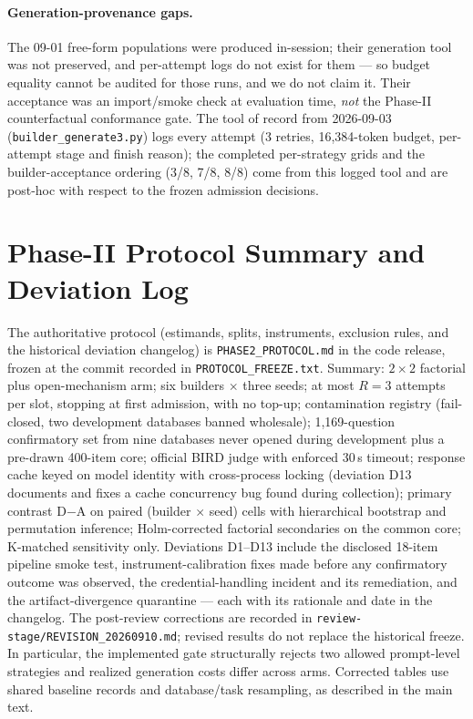 \paragraph{Generation-provenance gaps.} The 09-01 free-form populations
were produced in-session; their generation tool was not preserved, and
per-attempt logs do not exist for them --- so budget equality cannot be
audited for those runs, and we do not claim it. Their acceptance was an
import/smoke check at evaluation time, \emph{not} the Phase-II
counterfactual conformance gate. The tool of record from 2026-09-03
(\texttt{builder\_generate3.py}) logs every attempt (3 retries,
16{,}384-token budget, per-attempt stage and finish reason); the completed
per-strategy grids and the builder-acceptance ordering (3/8, 7/8, 8/8)
come from this logged tool and are post-hoc with respect to the frozen
admission decisions.

\section{Phase-II Protocol Summary and Deviation Log}\label{app:phase2-protocol}

The authoritative protocol (estimands, splits, instruments, exclusion
rules, and the historical deviation changelog) is
\texttt{PHASE2\_PROTOCOL.md} in the code release, frozen at the commit
recorded in \texttt{PROTOCOL\_FREEZE.txt}. Summary: $2{\times}2$ factorial
plus open-mechanism arm; six builders $\times$ three seeds; at most
$R{=}3$ attempts per slot, stopping at first admission, with no top-up;
contamination registry (fail-closed,
two development databases banned wholesale); 1{,}169-question confirmatory
set from nine databases never opened during development plus a pre-drawn 400-item core;
official BIRD judge with enforced 30\,s timeout; response cache keyed on
model identity with cross-process locking (deviation D13 documents and
fixes a cache concurrency bug found during collection); primary contrast
D$-$A on paired (builder $\times$ seed) cells with hierarchical bootstrap
and permutation inference; Holm-corrected factorial secondaries on the
common core; K-matched sensitivity only. Deviations D1--D13 include the
disclosed 18-item pipeline smoke test, instrument-calibration fixes made
before any confirmatory outcome was observed, the credential-handling
incident and its remediation, and the artifact-divergence quarantine ---
each with its rationale and date in the changelog.
The post-review corrections are recorded in
\texttt{review-stage/REVISION\_20260910.md}; revised results do not replace
the historical freeze. In particular, the implemented gate structurally
rejects two allowed prompt-level strategies and realized generation costs
differ across arms. Corrected tables use shared baseline records and
database/task resampling, as described in the main text.


